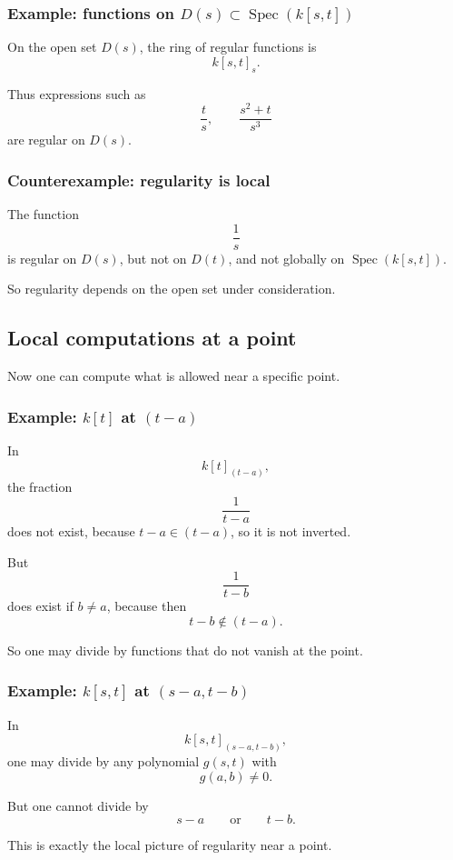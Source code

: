 \documentclass[12pt,a4paper]{article}
\theoremstyle{notespace}
\newcommand{\Spec}{\operatorname{Spec}}
\theoremstyle{definition}
\begin{document}
\subsubsection{Example: functions on \(D(s)\subset \Spec(k[s,t])\)}

On the open set \(D(s)\), the ring of regular functions is
\[
k[s,t]_s.
\]

Thus expressions such as
\[
\frac{t}{s},
\qquad
\frac{s^2+t}{s^3}
\]
are regular on \(D(s)\).

\subsubsection{Counterexample: regularity is local}

The function
\[
\frac{1}{s}
\]
is regular on \(D(s)\), but not on \(D(t)\), and not globally on \(\Spec(k[s,t])\).

So regularity depends on the open set under consideration.

\subsection{Local computations at a point}

Now one can compute what is allowed near a specific point.

\subsubsection{Example: \(k[t]\) at \((t-a)\)}

In
\[
k[t]_{(t-a)},
\]
the fraction
\[
\frac{1}{t-a}
\]
does not exist, because \(t-a\in (t-a)\), so it is not inverted.

But
\[
\frac{1}{t-b}
\]
does exist if \(b\neq a\), because then
\[
t-b\notin (t-a).
\]

So one may divide by functions that do not vanish at the point.

\subsubsection{Example: \(k[s,t]\) at \((s-a,t-b)\)}

In
\[
k[s,t]_{(s-a,t-b)},
\]
one may divide by any polynomial \(g(s,t)\) with
\[
g(a,b)\neq 0.
\]

But one cannot divide by
\[
s-a
\qquad\text{or}\qquad
t-b.
\]

This is exactly the local picture of regularity near a point.
\end{document}
